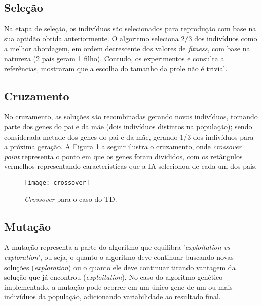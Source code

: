 
\subsection{Seleção}
\label{sec:ag-selecao}

Na etapa de seleção, os indivíduos são selecionados para reprodução com base na sua aptidão obtida anteriormente. O algoritmo seleciona 2/3 dos indivíduos como a melhor abordagem, em ordem decrescente dos valores de \textit{fitness}, com base na natureza (2 pais geram 1 filho). Contudo, os experimentos e consulta a referências, mostraram que a escolha do tamanho da prole não é trivial. \citep{jansen05:offspring}

\subsection{Cruzamento}
\label{sec:ag-cruzamento}

No cruzamento, as soluções são recombinadas gerando novos indivíduos, tomando parte dos genes do pai e da mãe (dois indivíduos distintos na população); sendo considerada metade dos genes do pai e da mãe, gerando 1/3 dos indivíduos para a próxima geração. A Figura \ref{fig:crossover} a seguir ilustra o cruzamento, onde \textit{crossover point} representa o ponto em que os genes foram divididos, com os retângulos vermelhos representando características que a IA selecionou de cada um dos pais.

\begin{figure}
  \centering
  \texttt{[image: crossover]}
  \caption{\textit{Crossover} para o caso do TD.\label{fig:crossover}}
\end{figure}

\subsection{Mutação}
\label{sec:ag-mutacao}

A mutação representa a parte do algoritmo que equilibra '\textit{exploitation vs exploration}', ou seja, o quanto o algoritmo deve continuar buscando novas soluções (\textit{exploration}) ou o quanto ele deve continuar tirando vantagem da solução que já encontrou (\textit{exploitation}). No caso do algoritmo genético implementado, a mutação pode ocorrer em um único gene de um ou mais indivíduos da população, adicionando variabilidade ao resultado final. \citep{eiben98:exploitvsexplore}. 

